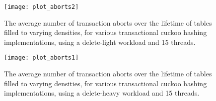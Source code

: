 \documentclass{sig-alternate-05-2015}
\begin{document}
\begin{figure}[!htb]
  \texttt{[image: plot\_aborts2]}
  \caption{The average number of transaction aborts over the lifetime
    of tables filled to varying densities, for various transactional
    cuckoo hashing implementations, using a delete-light workload and
    15 threads.}
  \label{fig_E}
\end{figure}


\begin{figure}
  \texttt{[image: plot\_aborts1]}
  \caption{The average number of transaction aborts over the lifetime
    of tables filled to varying densities, for various transactional
    cuckoo hashing implementations, using a delete-heavy workload and
    15 threads.}
  \label{fig_F}
\end{figure}
\end{document}
